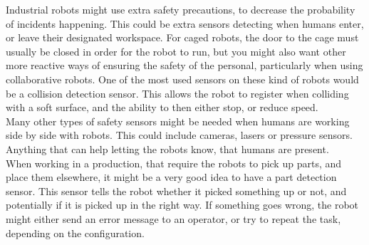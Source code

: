 Industrial robots might use extra safety precautions, to decrease the probability of incidents happening. This could be extra sensors detecting when humans enter, or leave their designated workspace. For caged robots, the door to the cage must usually be closed in order for the robot to run, but you might also want other more reactive ways of ensuring the safety of the personal, particularly when using collaborative robots. One of the most used sensors on these kind of robots would be a collision detection sensor. This allows the robot to register when colliding with a soft surface, and the ability to then either stop, or reduce speed.\\

Many other types of safety sensors might be needed when humans are working side by side with robots. This could include cameras, lasers or pressure sensors. Anything that can help letting the robots know, that humans are present.\\

When working in a production, that require the robots to pick up parts, and place them elsewhere, it might be a very good idea to have a part detection sensor. This sensor tells the robot whether it picked something up or not, and potentially if it is picked up in the right way. If something goes wrong, the robot might either send an error message to an operator, or try to repeat the task, depending on the configuration.\\